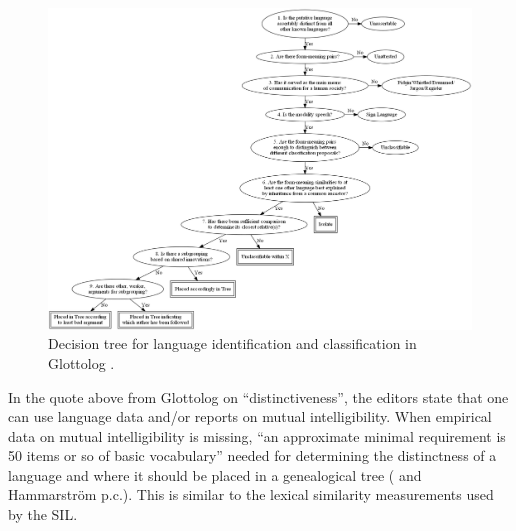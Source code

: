 \documentclass[a4paper,10pt]{article} %
\begin{document}
\begin{figure}[ht]
\centering
\includegraphics[width=16cm]{Glottolog_classifying_tree.png}
\caption[Decision tree for language identification and classification in Glottolog]{{Decision tree for language identification and classification in Glottolog \citep{glottologlanguoids}.}}
\label{glottolog_class_tree}
\end{figure}

In the quote above from Glottolog on ``distinctiveness'', the editors state that one can use language data and/or reports on mutual intelligibility. When empirical data on mutual intelligibility is missing, ``an approximate minimal requirement is 50 items or so of basic vocabulary'' needed for determining the distinctness of a language and where it should be placed in a genealogical tree  (\citet{glottologlanguoids} and Hammarström p.c.). This is similar to the lexical similarity measurements used by the SIL.
\end{document}
